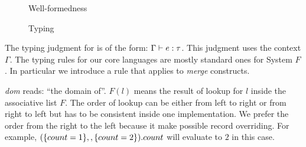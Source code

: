 \begin{figure*}

\caption{Well-formedness}
\end{figure*}

\begin{figure*}



\caption{Typing}
\end{figure*}

The typing judgment for \name is of the form: $ \Gamma \vdash e : \tau $. This
judgment uses the context $ \Gamma $. The typing rules for our core languages
are mostly standard ones for System $ F $. In particular we introduce a
 rule that applies to \emph{merge} constructs.


\textit{dom} reads: ``the domain of''. $ F(l) $ means the result of lookup for
$ l $ inside the associative list $ F $. The order of lookup can be either from
left to right or from right to left but has to be consistent inside one
implementation. We prefer the order from the right to the left because it make
possible record overriding. For example,
$ (\{ count = 1 \} ,, \{ count = 2 \}).count $ will evaluate to
$ 2 $ in this case.